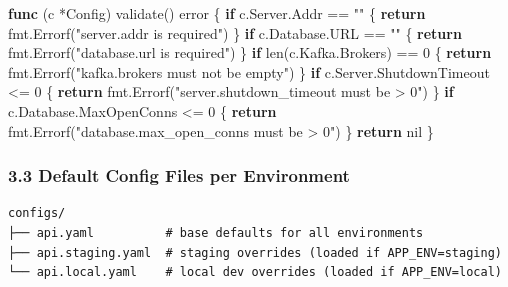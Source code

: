 \documentclass[
]{article}
\newenvironment{Shaded}{}{}
\newcommand{\BuiltInTok}[1]{\textcolor[rgb]{0.00,0.50,0.00}{#1}}
\newcommand{\ControlFlowTok}[1]{\textcolor[rgb]{0.00,0.44,0.13}{\textbf{#1}}}
\newcommand{\DataTypeTok}[1]{\textcolor[rgb]{0.56,0.13,0.00}{#1}}
\newcommand{\DecValTok}[1]{\textcolor[rgb]{0.25,0.63,0.44}{#1}}
\newcommand{\KeywordTok}[1]{\textcolor[rgb]{0.00,0.44,0.13}{\textbf{#1}}}
\newcommand{\NormalTok}[1]{#1}
\newcommand{\OperatorTok}[1]{\textcolor[rgb]{0.40,0.40,0.40}{#1}}
\newcommand{\OtherTok}[1]{\textcolor[rgb]{0.00,0.44,0.13}{#1}}
\newcommand{\StringTok}[1]{\textcolor[rgb]{0.25,0.44,0.63}{#1}}
\begin{document}
\begin{Shaded}
\begin{Highlighting}[]
\KeywordTok{func} \OperatorTok{(}\NormalTok{c }\OperatorTok{*}\NormalTok{Config}\OperatorTok{)}\NormalTok{ validate}\OperatorTok{()} \DataTypeTok{error} \OperatorTok{\{}
    \ControlFlowTok{if}\NormalTok{ c}\OperatorTok{.}\NormalTok{Server}\OperatorTok{.}\NormalTok{Addr }\OperatorTok{==} \StringTok{""} \OperatorTok{\{}
        \ControlFlowTok{return}\NormalTok{ fmt}\OperatorTok{.}\NormalTok{Errorf}\OperatorTok{(}\StringTok{"server.addr is required"}\OperatorTok{)}
    \OperatorTok{\}}
    \ControlFlowTok{if}\NormalTok{ c}\OperatorTok{.}\NormalTok{Database}\OperatorTok{.}\NormalTok{URL }\OperatorTok{==} \StringTok{""} \OperatorTok{\{}
        \ControlFlowTok{return}\NormalTok{ fmt}\OperatorTok{.}\NormalTok{Errorf}\OperatorTok{(}\StringTok{"database.url is required"}\OperatorTok{)}
    \OperatorTok{\}}
    \ControlFlowTok{if} \BuiltInTok{len}\OperatorTok{(}\NormalTok{c}\OperatorTok{.}\NormalTok{Kafka}\OperatorTok{.}\NormalTok{Brokers}\OperatorTok{)} \OperatorTok{==} \DecValTok{0} \OperatorTok{\{}
        \ControlFlowTok{return}\NormalTok{ fmt}\OperatorTok{.}\NormalTok{Errorf}\OperatorTok{(}\StringTok{"kafka.brokers must not be empty"}\OperatorTok{)}
    \OperatorTok{\}}
    \ControlFlowTok{if}\NormalTok{ c}\OperatorTok{.}\NormalTok{Server}\OperatorTok{.}\NormalTok{ShutdownTimeout }\OperatorTok{\textless{}=} \DecValTok{0} \OperatorTok{\{}
        \ControlFlowTok{return}\NormalTok{ fmt}\OperatorTok{.}\NormalTok{Errorf}\OperatorTok{(}\StringTok{"server.shutdown\_timeout must be \textgreater{} 0"}\OperatorTok{)}
    \OperatorTok{\}}
    \ControlFlowTok{if}\NormalTok{ c}\OperatorTok{.}\NormalTok{Database}\OperatorTok{.}\NormalTok{MaxOpenConns }\OperatorTok{\textless{}=} \DecValTok{0} \OperatorTok{\{}
        \ControlFlowTok{return}\NormalTok{ fmt}\OperatorTok{.}\NormalTok{Errorf}\OperatorTok{(}\StringTok{"database.max\_open\_conns must be \textgreater{} 0"}\OperatorTok{)}
    \OperatorTok{\}}
    \ControlFlowTok{return} \OtherTok{nil}
\OperatorTok{\}}
\end{Highlighting}
\end{Shaded}

\hypertarget{default-config-files-per-environment}{%
\subsubsection{3.3 Default Config Files per
Environment}\label{default-config-files-per-environment}}

\begin{verbatim}
configs/
├── api.yaml          # base defaults for all environments
├── api.staging.yaml  # staging overrides (loaded if APP_ENV=staging)
└── api.local.yaml    # local dev overrides (loaded if APP_ENV=local)
\end{verbatim}
\end{document}
